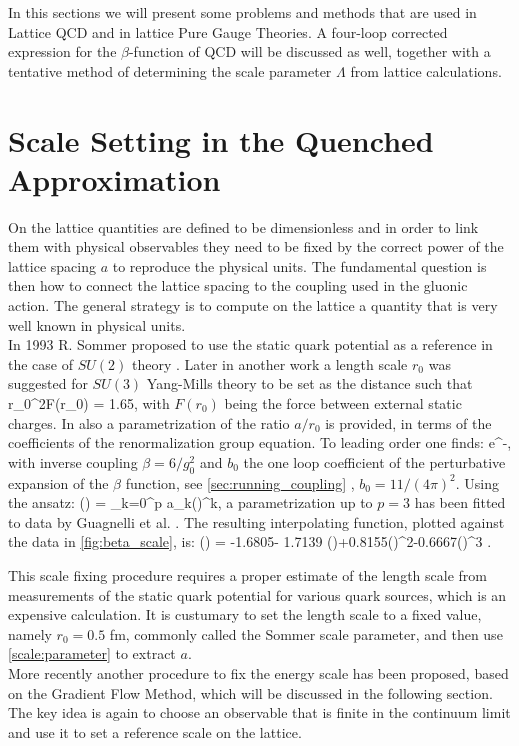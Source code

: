 In this sections we will present some problems and methods that are used in Lattice QCD and in lattice Pure Gauge Theories. A four-loop corrected expression for the $\beta$-function of QCD will be discussed as well, together with a tentative method of determining the scale parameter $\Lambda$ from lattice calculations.

\section{Scale Setting in the Quenched Approximation}
On the lattice quantities are defined to be dimensionless and in order to link them with physical observables they need to be fixed by the correct power of the lattice spacing $a$ to reproduce the physical units. The fundamental question is then how to connect the lattice spacing to the coupling used in the gluonic action. The general strategy is to compute on the lattice a quantity that is very well known in physical units.\\ 
In 1993 R. Sommer proposed to use the static quark potential as a reference in the case of $SU(2)$ theory \cite{sommer_new_1994}. Later in another work \cite{guagnelli_precision_1998} a length scale $r_0$ was suggested for $SU(3)$ Yang-Mills theory to be set as the distance such that 
\beq
r_0^2F(r_0) = 1.65,
\eeq 
with $F(r_0)$ being the force between external static charges. In \cite{guagnelli_precision_1998} also a parametrization of the ratio $a/r_0$ is provided, in terms of the coefficients of the renormalization group equation. To leading order one finds:
\beq
     \propto e^{-},
\eeq
with inverse coupling $\beta = 6/g_0^2$ and $b_0$ the one loop coefficient of the perturbative expansion of the $\beta$ function, see \cref{sec:running_coupling}
, $b_0=11/(4\pi)^2$. Using the ansatz:
\beq
    \ln\left(\right) = \sum_{k=0}^p a_k()^k,
\eeq
a parametrization up to $p=3$ has been fitted to data by Guagnelli et al. \cite{guagnelli_precision_1998}. The resulting interpolating function, plotted against the data in \cref{fig:beta_scale}, is:
\beq
    \ln\left(\right) = -1.6805- 1.7139 ()+0.8155()^2-0.6667()^3
    \label{scale:parameter}.
\eeq

 
This scale fixing procedure requires a proper estimate of the length scale from measurements of the static quark potential for various quark sources, which is an expensive calculation. It is custumary to set the length scale to a fixed value, namely $r_0 = 0.5$ fm, commonly called the Sommer scale parameter, and then use \cref{scale:parameter} to extract $a$. \\
More recently another procedure to fix the energy scale has been proposed, based on the Gradient Flow Method, which will be discussed in the following section. The key idea is again to choose an observable that is finite in the continuum limit and use it to set a reference scale on the lattice.

